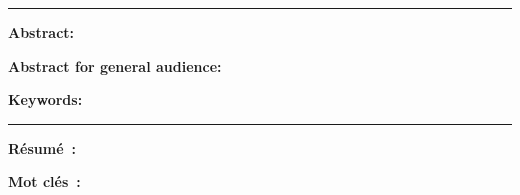 \documentclass[english,a4paper,11pt,twoside]{StyleThese}
\begin{document}
\cleardoublepage
\begin{vcenterpage}
\noindent\rule[2pt]{\textwidth}{0.5pt}


\textbf{Abstract:}

\textbf{Abstract for general audience:}


\textbf{Keywords:}
\\
\noindent\rule[2pt]{\textwidth}{0.5pt}
\end{vcenterpage}


\clearpage
\pagestyle{empty}

\textbf{Résumé~:}

\textbf{Mot clés~:}
\end{document}
